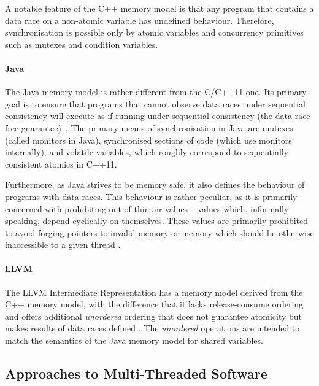 A notable feature of the C++ memory model is that any program that contains a
data race on a non-atomic variable has undefined
behaviour.
Therefore, synchronisation is possible only by atomic variables and
concurrency primitives such as mutexes and condition variables.

\paragraph{Java}
%
The Java memory model is rather different from the C/C++11 one.
Its primary goal is to ensure that programs that cannot observe data races
under sequential consistency will execute as if running under sequential
consistency (the data race free guarantee)~.
The primary means of synchronisation in Java are mutexes (called monitors in Java), synchronised sections of code (which use monitors internally), and volatile variables, which roughly correspond to sequentially consistent atomics in C++11.

Furthermore, as Java strives to be memory safe, it also defines the behaviour of programs with data races.
This behaviour is rather peculiar, as it is primarily concerned with prohibiting out-of-thin-air values -- values which, informally speaking, depend cyclically on themselves.
These values are primarily prohibited to avoid forging pointers to invalid memory or memory which should be otherwise inaccessible to a given thread .

\paragraph{LLVM}
%
The LLVM Intermediate Representation has a memory model derived from the C++
memory model, with the difference that it lacks release-consume ordering and
offers additional \emph{unordered} ordering that does not guarantee atomicity
but makes results of data races defined .
The \emph{unordered} operations are intended to match the semantics of the Java
memory model for shared variables.

\subsection{Approaches to Multi-Threaded Software}

